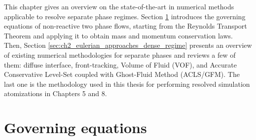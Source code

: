 	
This chapter gives an overview on the state-of-the-art in numerical methods applicable to resolve separate phase regimes. Section \ref{sec:ch2_governing_equations} introduces the governing equations of non-reactive two phase flows, starting from the Reynolds Transport Theorem and applying it to obtain mass and momentum conservation laws. Then, Section \ref{sec:ch2_eulerian_approaches_dense_regime} presents an overview of existing numerical methodologies for separate phases and reviews a few of them: diffuse interface, front-tracking, Volume of Fluid (VOF), and Accurate Conservative Level-Set coupled with Ghost-Fluid Method (ACLS/GFM). The last one is the methodology used in this thesis for performing resolved simulation atomizations in Chapters 5 and 8.%





\section{Governing equations }
\label{sec:ch2_governing_equations}


